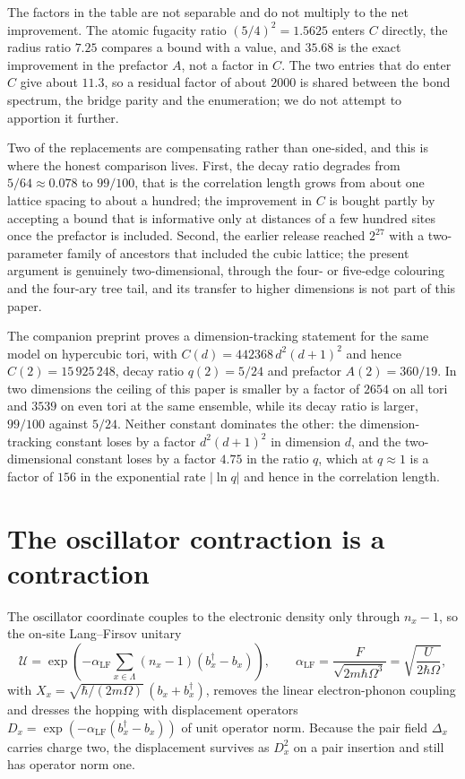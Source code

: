 \documentclass[11pt]{article}
\theoremstyle{plain}
\theoremstyle{definition}
\newcommand{\Dop}{\Delta}
\begin{document}
The factors in the table are not separable and do not multiply to the net
improvement. The atomic fugacity ratio $(5/4)^{2}=1.5625$ enters $C$ directly, the
radius ratio $7.25$ compares a bound with a value, and $35.68$ is the exact
improvement in the prefactor $A$, not a factor in $C$. The two entries that do enter
$C$ give about $11.3$, so a residual factor of about $2000$ is shared between the
bond spectrum, the bridge parity and the enumeration; we do not attempt to apportion
it further.

Two of the replacements are compensating rather than one-sided, and this is where
the honest comparison lives. First, the decay ratio degrades from $5/64\approx0.078$
to $99/100$, that is the correlation length grows from about one lattice spacing to
about a hundred; the improvement in $C$ is bought partly by accepting a bound that is
informative only at distances of a few hundred sites once the prefactor is included.
Second, the earlier release reached $2^{27}$ with a two-parameter family of ancestors
that included the cubic lattice; the present argument is genuinely
two-dimensional, through the four- or five-edge colouring and the four-ary tree tail,
and its transfer to higher dimensions is not part of this paper.

The companion preprint \cite{rens2026b} proves a dimension-tracking statement for the
same model on hypercubic tori, with
$C(d)=442368\,d^{2}(d+1)^{2}$ and hence $C(2)=15\,925\,248$, decay ratio
$q(2)=5/24$ and prefactor $A(2)=360/19$. In two dimensions the ceiling of this paper
is smaller by a factor of $2654$ on all tori and $3539$ on even tori at the same
ensemble, while its decay ratio is larger, $99/100$ against $5/24$. Neither constant
dominates the other: the dimension-tracking constant loses by a factor
$d^{2}(d+1)^{2}$ in dimension $d$, and the two-dimensional constant loses by a factor
$4.75$ in the ratio $q$, which at $q\approx1$ is a factor of $156$ in the exponential
rate $|\ln q|$ and hence in the correlation length.

\section{The oscillator contraction is a contraction}\label{sec:langfirsov}

The oscillator coordinate couples to the electronic density only through
$n_x-1$, so the on-site Lang--Firsov unitary \cite{hohenadler2007}
\[
\mathcal{U}=\exp\!\left(-\alpha_{\mathrm{LF}}\sum_{x\in\Lambda}(n_x-1)
(b_x^{\dagger}-b_x)\right),\qquad
\alpha_{\mathrm{LF}}=\frac{F}{\sqrt{2m\hbar\Omega^{3}}}
=\sqrt{\frac{U}{2\hbar\Omega}},
\]
with $X_x=\sqrt{\hbar/(2m\Omega)}\,(b_x+b_x^{\dagger})$, removes the linear
electron-phonon coupling and dresses the hopping with displacement operators
$D_x=\exp(-\alpha_{\mathrm{LF}}(b_x^{\dagger}-b_x))$ of unit operator norm. Because
the pair field $\Dop_x$ carries charge two, the displacement survives as
$D_x^{2}$ on a pair insertion and still has operator norm one.
\end{document}
